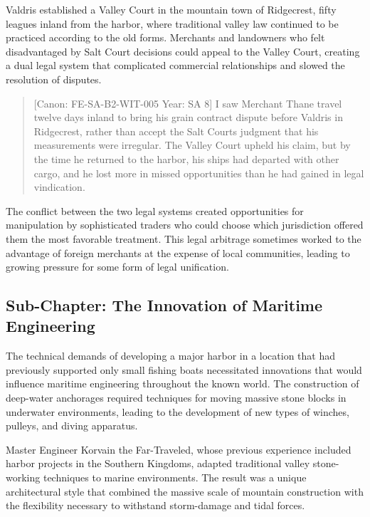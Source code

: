 Valdris established a Valley Court in the mountain town of Ridgecrest,
fifty leagues inland from the harbor, where traditional valley law
continued to be practiced according to the old forms. Merchants and
landowners who felt disadvantaged by Salt Court decisions could appeal
to the Valley Court, creating a dual legal system that complicated
commercial relationships and slowed the resolution of disputes.

\begin{quote}
{[}Canon: FE-SA-B2-WIT-005 \textbar{} Year: SA 8{]} I saw Merchant Thane
travel twelve days inland to bring his grain contract dispute before
Valdris in Ridgecrest, rather than accept the Salt
Court\textquotesingle s judgment that his measurements were irregular.
The Valley Court upheld his claim, but by the time he returned to the
harbor, his ships had departed with other cargo, and he lost more in
missed opportunities than he had gained in legal vindication.
\end{quote}

The conflict between the two legal systems created opportunities for
manipulation by sophisticated traders who could choose which
jurisdiction offered them the most favorable treatment. This legal
arbitrage sometimes worked to the advantage of foreign merchants at the
expense of local communities, leading to growing pressure for some form
of legal unification.

\subsection{Sub-Chapter: The Innovation of Maritime
Engineering}\label{sub-chapter-the-innovation-of-maritime-engineering}

The technical demands of developing a major harbor in a location that
had previously supported only small fishing boats necessitated
innovations that would influence maritime engineering throughout the
known world. The construction of deep-water anchorages required
techniques for moving massive stone blocks in underwater environments,
leading to the development of new types of winches, pulleys, and diving
apparatus.

Master Engineer Korvain the Far-Traveled, whose previous experience
included harbor projects in the Southern Kingdoms, adapted traditional
valley stone-working techniques to marine environments. The result was a
unique architectural style that combined the massive scale of mountain
construction with the flexibility necessary to withstand storm-damage
and tidal forces.


